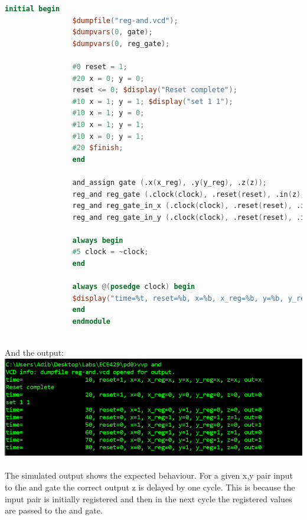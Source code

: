 \documentclass{report}
\begin{document}
\begin{enumerate}
{\begin{lstlisting}[language=verilog]
				initial begin
				$dumpfile("reg-and.vcd");
				$dumpvars(0, gate);
				$dumpvars(0, reg_gate);
				
				#0 reset = 1;
				#20 x = 0; y = 0;
				reset <= 0; $display("Reset complete");
				#10 x = 1; y = 1; $display("set 1 1");
				#10 x = 1; y = 0;
				#10 x = 1; y = 1;
				#10 x = 0; y = 1;
				#20 $finish;
				end
				
				and_assign gate (.x(x_reg), .y(y_reg), .z(z));
				reg_and reg_gate (.clock(clock), .reset(reset), .in(z), .out(out));
				reg_and reg_gate_in_x (.clock(clock), .reset(reset), .in(x), .out(x_reg));
				reg_and reg_gate_in_y (.clock(clock), .reset(reset), .in(y), .out(y_reg));
				
				always begin
				#5 clock = ~clock;
				end
				
				always @(posedge clock) begin
				$display("time=%t, reset=%b, x=%b, x_reg=%b, y=%b, y_reg=%b, z=%b, out=%b", $time,reset,x, x_reg, y, y_reg, z, out);
				end
				endmodule 
			\end{lstlisting}\\
			And the output:\\
			\includegraphics[scale=0.5]{reg_insert_output}\\\\
			The simulated output shows the expected behaviour. For a given x,y pair input to the and gate the correct output z is delayed by one cycle. This is because the input pair is initially registered and then in the next cycle the registered values are passed to the and gate.
		}
	\end{enumerate}
\end{document}
